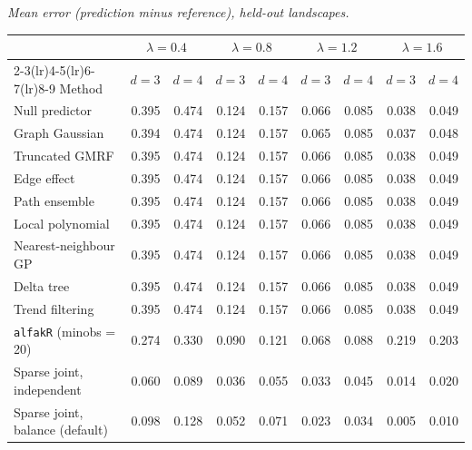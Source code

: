 \par\medskip\noindent\begin{minipage}{\linewidth}
\textit{Mean error (prediction minus reference), held-out landscapes.}
\begin{center}
\footnotesize
\setlength{\tabcolsep}{3.5pt}
\begin{tabular}{l*{8}{r}}
\toprule
 & \multicolumn{2}{c}{$\lambda=0.4$} & \multicolumn{2}{c}{$\lambda=0.8$} & \multicolumn{2}{c}{$\lambda=1.2$} & \multicolumn{2}{c}{$\lambda=1.6$} \\
\cmidrule(lr){2-3}\cmidrule(lr){4-5}\cmidrule(lr){6-7}\cmidrule(lr){8-9}
Method & $d=3$ & $d=4$ & $d=3$ & $d=4$ & $d=3$ & $d=4$ & $d=3$ & $d=4$ \\
\midrule
Null predictor & 0.395 & 0.474 & 0.124 & 0.157 & 0.066 & 0.085 & 0.038 & 0.049 \\
Graph Gaussian & 0.394 & 0.474 & 0.124 & 0.157 & 0.065 & 0.085 & 0.037 & 0.048 \\
Truncated GMRF & 0.395 & 0.474 & 0.124 & 0.157 & 0.066 & 0.085 & 0.038 & 0.049 \\
Edge effect & 0.395 & 0.474 & 0.124 & 0.157 & 0.066 & 0.085 & 0.038 & 0.049 \\
Path ensemble & 0.395 & 0.474 & 0.124 & 0.157 & 0.066 & 0.085 & 0.038 & 0.049 \\
Local polynomial & 0.395 & 0.474 & 0.124 & 0.157 & 0.066 & 0.085 & 0.038 & 0.049 \\
Nearest-neighbour GP & 0.395 & 0.474 & 0.124 & 0.157 & 0.066 & 0.085 & 0.038 & 0.049 \\
Delta tree & 0.395 & 0.474 & 0.124 & 0.157 & 0.066 & 0.085 & 0.038 & 0.049 \\
Trend filtering & 0.395 & 0.474 & 0.124 & 0.157 & 0.066 & 0.085 & 0.038 & 0.049 \\
\texttt{alfakR} (minobs = 20) & 0.274 & 0.330 & 0.090 & 0.121 & 0.068 & 0.088 & 0.219 & 0.203 \\
Sparse joint, independent & 0.060 & 0.089 & 0.036 & 0.055 & 0.033 & 0.045 & 0.014 & 0.020 \\
Sparse joint, balance (default) & 0.098 & 0.128 & 0.052 & 0.071 & 0.023 & 0.034 & 0.005 & 0.010 \\
\bottomrule
\end{tabular}
\end{center}
\end{minipage}

